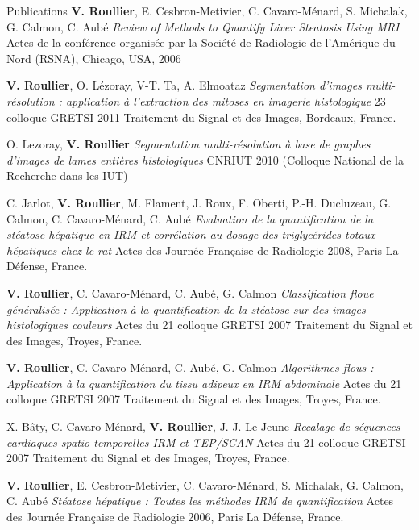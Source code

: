 \begin{rubric}{Publications}
  \entry*[2006]
  \textbf{V. Roullier}, E. Cesbron-Metivier, C. Cavaro-Ménard, S. Michalak, G. Calmon, C. Aubé
  \textit{Review of Methods to Quantify Liver Steatosis Using MRI}
  Actes de la conférence organisée par la Société de Radiologie de l'Amérique du Nord (RSNA), Chicago, USA, 2006 

  
  
  \entry*[2011]
  \textbf{V. Roullier}, O. L{\'e}zoray, V-T. Ta, A. Elmoataz
  \emph{Segmentation d'images multi-r\'esolution : application à l'extraction des mitoses en imagerie histologique} 
  23 colloque GRETSI 2011 Traitement du Signal et des Images, Bordeaux, France.
  
  \entry*[2010]
  O. Lezoray, \textbf{V. Roullier}
  \textit{Segmentation multi-résolution à base de graphes d'images de lames entières histologiques}
  CNRIUT 2010 (Colloque National de la Recherche dans les IUT) 

  \entry*[2008]
  C. Jarlot, \textbf{V. Roullier}, M. Flament, J. Roux, F. Oberti, P.-H. Ducluzeau, G. Calmon, C. Cavaro-Ménard, C. Aubé
  \textit{Evaluation de la quantification de la stéatose hépatique en IRM et corrélation au dosage des triglycérides totaux hépatiques chez le rat}  
  Actes des Journée Française de Radiologie 2008, Paris La Défense, France.

  \entry*[2007]
  \textbf{V. Roullier}, C. Cavaro-Ménard, C. Aubé, G. Calmon
  \textit{Classification floue généralisée : Application à la quantification de la stéatose sur des images histologiques couleurs} 
  Actes du 21 colloque GRETSI 2007 Traitement du Signal et des Images, Troyes, France.

  \entry*[2007]
  \textbf{V. Roullier}, C. Cavaro-Ménard, C. Aubé, G. Calmon 
  \textit{Algorithmes flous : Application à la quantification du tissu adipeux en IRM abdominale} 
  Actes du 21 colloque GRETSI 2007 Traitement du Signal et des Images, Troyes, France.

  \entry*[2007]
  X. Bâty, C. Cavaro-Ménard, \textbf{V. Roullier}, J.-J. Le Jeune 
  \textit{Recalage de séquences cardiaques spatio-temporelles IRM et TEP/SCAN} 
  Actes du 21 colloque GRETSI 2007 Traitement du Signal et des Images, Troyes, France.
  
  \entry*[2006]
  \textbf{V. Roullier}, E. Cesbron-Metivier, C. Cavaro-Ménard, S. Michalak, G. Calmon, C. Aubé
  \textit{Stéatose hépatique : Toutes les méthodes IRM de quantification} 
  Actes des Journée Française de Radiologie 2006, Paris La Défense, France.


\end{rubric}
